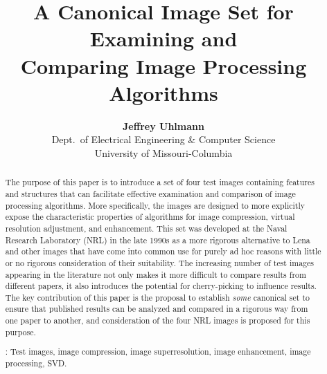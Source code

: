 \documentclass{article}
\begin{document}
\title{{\bf A Canonical Image Set for Examining and\\ 
           Comparing Image Processing Algorithms}\vspace{0pt} }       
\author{
{\bf Jeffrey Uhlmann}\\
{\small Dept.\ of Electrical Engineering \& Computer Science}\\
{\small University of Missouri-Columbia}}
\date{}       
\maketitle



\begin{abstract}
The purpose of this paper is to introduce a set of four test images
containing features and structures that can facilitate effective 
examination and comparison of image processing algorithms. 
More specifically, the images are designed to more explicitly 
expose the characteristic properties of algorithms for 
image compression, virtual resolution adjustment, and
enhancement. This set was developed at the Naval Research 
Laboratory (NRL) in the late 1990s as a more rigorous alternative to 
Lena and other images that have come into common use for 
purely ad hoc reasons with little or no rigorous consideration of 
their suitability. The increasing number of test images 
appearing in the literature not only makes it more difficult to
compare results from different papers, it also introduces the
potential for cherry-picking to influence results.
The key contribution of this paper is the proposal to 
establish {\em some} canonical set to ensure that published 
results can be analyzed and compared in a rigorous way 
from one paper to another, and consideration of the four 
NRL images is proposed for this purpose.\\ 

\begin{footnotesize}
: {\sf\footnotesize Test images, image compression, image superresolution, 
image enhancement, image processing, SVD.}
\end{footnotesize}
\end{abstract}
\end{document}
